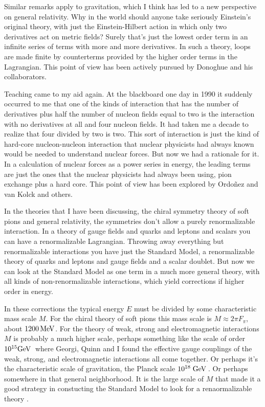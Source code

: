 \documentclass[12pt]{article}
\def\gev{{\rm GeV}\,}
\begin{document}
Similar remarks apply to gravitation, which I think has led to a new perspective on general relativity.   Why in the world should anyone take seriously Einstein's original theory, with just the Einstein-Hilbert action in which  only two derivatives act on metric fields? Surely that's just the lowest order term in an infinite series of terms with more and more derivatives.  In such a theory,   loops are made finite by counterterms provided by the higher order terms in the Lagrangian. This   point of view   has been actively pursued by Donoghue and his collaborators. 

Teaching came to my aid again.  At the blackboard one day in 1990 it suddenly occurred to me that one of the kinds of interaction that has the number of derivatives plus half the number of nucleon fields equal to two is the interaction with no derivatives at all and four nucleon fields. It had taken me a decade to realize that four divided by two is two. This sort of interaction  is just the kind of hard-core nucleon-nucleon interaction that nuclear physicists had always known would be needed to understand nuclear forces. But now we had a rationale for it. In a calculation of nuclear forces as a power series in energy, the leading terms are just the ones that the nuclear physicists had always been using, pion exchange plus a hard core.  This point of view has been explored by Ordo\~{n}ez and van Kolck and others.

In the theories that I have been discussing, the chiral symmetry theory of soft pions and general relativity, the symmetries don't allow a purely renormalizable interaction. In a theory of gauge fields and quarks and leptons and scalars you can have a renormalizable Lagrangian.  Throwing away everything but renormalizable interactions you have just the Standard Model, a renormalizable theory of quarks and leptons and gauge fields and a scalar doublet. But now we can look at the Standard Model as one term  in a much more general theory, with all kinds of non-renormalizable interactions, which yield corrections if  higher order in energy.  

In these corrections the typical energy $E$ must be divided by some characteristic  mass scale $M$. For the chiral theory of soft pions this mass scale is  $M\approx 2\pi F_\pi$, about $1200\,{\rm MeV}$. For the theory of weak, strong and electromagnetic interactions $M$ is probably a much higher scale, perhaps something like the scale of order $10^{15}\gev$ where Georgi, Quinn and I found the effective gauge couplings of the weak, strong, and electromagnetic interactions  all come together. Or perhaps it's the characteristic scale of gravitation, the Planck scale $10^{18}\;\gev$.  Or perhaps  somewhere in that general neighborhood.  It is the large scale of $M$ that made it a good strategy in constucting the Standard Model to look for a renaormalizable theory .
\end{document}
